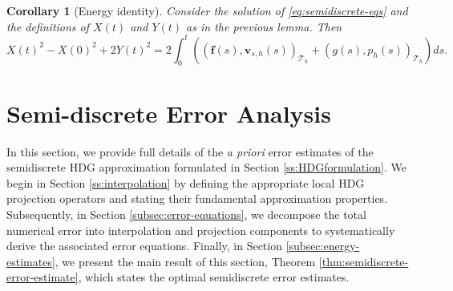 \documentclass[10pt,letterpaper]{amsart}
\theoremstyle{plain} %
\newtheorem{corollary}[theorem]{Corollary} %
\theoremstyle{remark} %
\newcommand{\vect}[1]{\mathbf{#1}}
\newcommand{\Thprod}[2]{( #1, #2 )_{\mathcal{T}_h}}
\begin{document}
\begin{corollary}[Energy identity]
	Consider the solution of \eqref{eq:semidiscrete-eqs} and the definitions of $X(t)$ and $Y(t)$ as in the previous lemma. Then
	\[
	X(t)^{2} - X(0)^{2} + 2Y(t)^{2} = 2 \int_0^{t}\left( \Thprod{\vect{f}(s)}{\vect{v}_{s,h}(s)} + \Thprod{g(s)}{p_{h}(s)}\right) ds.
	\]
	
\end{corollary}

\section{Semi-discrete Error Analysis}\label{sec:semidiscrete-error-analysis}

{
In this section, we provide full details of the \textit{a priori} error estimates of the semidiscrete HDG approximation formulated in Section \ref{ss:HDGformulation}. We begin in Section \ref{ss:interpolation} by defining the appropriate local HDG projection operators and stating their fundamental approximation properties. Subsequently, in Section \ref{subsec:error-equations}, we decompose the total numerical error into interpolation and projection components to systematically derive the associated error equations. Finally, in Section \ref{subsec:energy-estimates}, we present the main result of this section, Theorem \ref{thm:semidiscrete-error-estimate}, which states the optimal semidiscrete error estimates.
}
\end{document}
